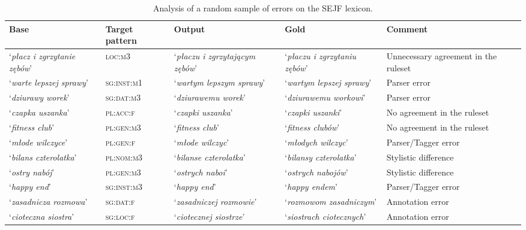 \documentclass[12pt]{article}
\newcommand{\inlinegloss}[1]{`\textit{#1}'}
\begin{document}
\begin{table}[]
\scriptsize
\centering
\begin{tabular}{p{2.2cm}|p{2.2cm}|p{2.2cm}|p{2.2cm}|p{2.2cm}}
\textbf{Base} & \textbf{Target pattern} & \textbf{Output} & \textbf{Gold} & \textbf{Comment} \\
\toprule
	\inlinegloss{płacz i zgrzytanie zębów} & \textsc{loc:m3} & \inlinegloss{płaczu i zgrzytającym zębów} & \inlinegloss{płaczu i zgrzytaniu zębów} & Unnecessary agreement in the ruleset \\
\hline
	\inlinegloss{warte lepszej sprawy} & \textsc{sg:inst:m1} & \inlinegloss{wartym lepszym sprawy} & \inlinegloss{wartym lepszej sprawy} & Parser error \\
\hline
	\inlinegloss{dziurawy worek} & \textsc{sg:dat:m3} & \inlinegloss{dziurawemu worek} & \inlinegloss{dziurawemu workowi} & Parser error \\
\hline
	\inlinegloss{czapka uszanka} & \textsc{pl:acc:f} & \inlinegloss{czapki uszanka} & \inlinegloss{czapki uszanki} & No agreement in the ruleset \\
\hline
	\inlinegloss{fitness club} & \textsc{pl:gen:m3} & \inlinegloss{fitness club} & \inlinegloss{fitness clubów} & No agreement in the ruleset \\
\hline
	\inlinegloss{młode wilczyce} & \textsc{pl:gen:f} & \inlinegloss{młode wilczyc} & \inlinegloss{młodych wilczyc} & Parser/Tagger error \\
\hline
	\inlinegloss{bilans czterolatka} & \textsc{pl:nom:m3} & \inlinegloss{bilanse czterolatka} & \inlinegloss{bilansy czterolatka} & Stylistic difference \\
\hline
	\inlinegloss{ostry nabój} & \textsc{pl:gen:m3} & \inlinegloss{ostrych naboi} & \inlinegloss{ostrych nabojów} & Stylistic difference \\
\hline
	\inlinegloss{happy end} & \textsc{sg:inst:m3} & \inlinegloss{happy end} & \inlinegloss{happy endem} & Parser/Tagger error \\
\hline
	\inlinegloss{zasadnicza rozmowa} & \textsc{sg:dat:f} & \inlinegloss{zasadniczej rozmowie} & \inlinegloss{rozmowom zasadniczym} & Annotation error \\
\hline
	\inlinegloss{cioteczna siostra} & \textsc{sg:loc:f} & \inlinegloss{ciotecznej siostrze} & \inlinegloss{siostrach ciotecznych} & Annotation error \\
\bottomrule
\end{tabular}
\caption{Analysis of a random sample of errors on the SEJF lexicon.}
\label{tab:quanterr}
\end{table}
\end{document}

